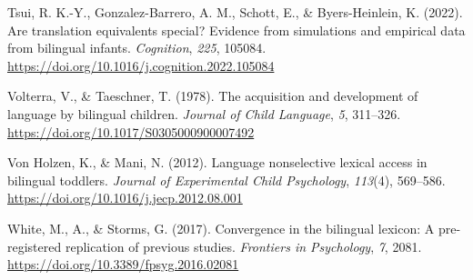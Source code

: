 \documentclass[
  ,man,floatsintext]{apa6}
\newlength{\cslhangindent}
\newlength{\cslentryspacingunit} %
\newenvironment{CSLReferences}[2] %
 {%
  \setlength{\parindent}{0pt}
  \ifodd #1
  \let\oldpar\par
  \def\par{\hangindent=\cslhangindent\oldpar}
  \fi
  \setlength{\parskip}{#2\cslentryspacingunit}
 }%
 {}
\begin{document}
\begin{CSLReferences}{1}{0}
\leavevmode{}%
Tsui, R. K.-Y., Gonzalez-Barrero, A. M., Schott, E., \& Byers-Heinlein, K. (2022). Are translation equivalents special? Evidence from simulations and empirical data from bilingual infants. \emph{Cognition}, \emph{225}, 105084. \url{https://doi.org/10.1016/j.cognition.2022.105084}

\leavevmode{}%
Volterra, V., \& Taeschner, T. (1978). The acquisition and development of language by bilingual children. \emph{Journal of Child Language}, \emph{5}, 311--326. \url{https://doi.org/10.1017/S0305000900007492}

\leavevmode{}%
Von Holzen, K., \& Mani, N. (2012). Language nonselective lexical access in bilingual toddlers. \emph{Journal of Experimental Child Psychology}, \emph{113}(4), 569--586. \url{https://doi.org/10.1016/j.jecp.2012.08.001}

\leavevmode{}%
White, M., A., \& Storms, G. (2017). Convergence in the bilingual lexicon: A pre-registered replication of previous studies. \emph{Frontiers in Psychology}, \emph{7}, 2081. \url{https://doi.org/10.3389/fpsyg.2016.02081}

\end{CSLReferences}

\endgroup
\end{document}
